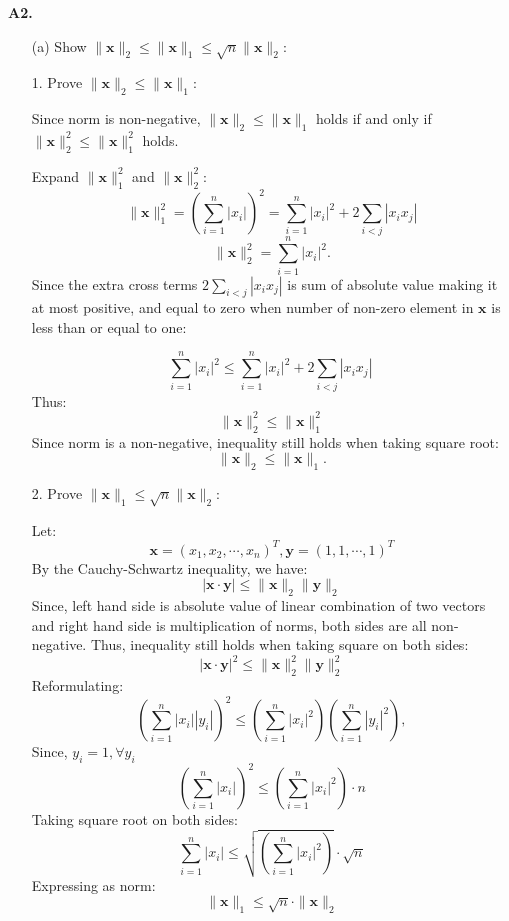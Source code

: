 \documentclass[12pt]{article}
\newcommand{\bvec}[1]{\mathbf{#1}} %
\newcommand{\bmat}[1]{\mathbf{#1}} %
\begin{document}
\textbf{A2.}

\begin{itemize}
    \item[(a)] Show \( \|\mathbf{x}\|_2 \leq \|\mathbf{x}\|_1 \leq \sqrt{n} \|\mathbf{x}\|_2 \):
    
    \vspace{\baselineskip}

    1. Prove \( \|\mathbf{x}\|_2 \leq \|\mathbf{x}\|_1 \):

    Since norm is non-negative, \( \|\mathbf{x}\|_2 \leq \|\mathbf{x}\|_1 \) holds if and only if
    \( \|\mathbf{x}\|_2^2 \leq \|\mathbf{x}\|_1^2 \) holds.
    
    Expand \( \|\mathbf{x}\|_1^2 \) and \( \|\mathbf{x}\|_2^2 \):
    \[
    \|\mathbf{x}\|_1^2 = \left(\sum_{i=1}^n |x_i|\right)^2 = \sum_{i=1}^n |x_i|^2 + 2\sum_{i < j} |x_i x_j|
    \]
    \[
    \|\mathbf{x}\|_2^2 = \sum_{i=1}^n |x_i|^2.
    \]
    Since the extra cross terms \( 2\sum_{i < j} |x_i x_j| \) is sum of absolute value making it at most positive,
    and equal to zero when number of non-zero element in $\bvec{x}$ is less than or equal to one:

    \[ 
     \sum_{i=1}^n |x_i|^2 \le  \sum_{i=1}^n |x_i|^2 + 2\sum_{i < j} |x_i x_j| \
    \]
    Thus:
    \[
    \|\mathbf{x}\|_2^2 \leq \|\mathbf{x}\|_1^2
    \]
    Since norm is a non-negative, inequality still holds when taking square root:
    \[
    \|\mathbf{x}\|_2 \leq \|\mathbf{x}\|_1.
    \]

    2. Prove \( \|\mathbf{x}\|_1 \leq \sqrt{n} \|\mathbf{x}\|_2 \):

    Let:
    \[
    \bmat{x} = (x_1,x_2,\cdots,x_n)^T, \bmat{y}=(1,1,\cdots,1)^T
    \]
    By the Cauchy-Schwartz inequality, we have:
    \[
    |\bmat{x}\cdot \bmat{y}| \le \|\bmat{x}\|_2\|\bmat{y}\|_2
    \]
    Since, left hand side is absolute value of linear combination of two vectors and right hand side is
    multiplication of norms, both sides are all non-negative.
    Thus, inequality still holds when taking square on both sides:
    \[
    |\bmat{x}\cdot \bmat{y}|^2 \le \|\bmat{x}\|_2^2\|\bmat{y}\|_2^2
    \]
    Reformulating:
    \[
    \left( \sum_{i=1}^n |x_i| |y_i| \right)^2 \leq \left( \sum_{i=1}^n |x_i|^2 \right) \left( \sum_{i=1}^n |y_i|^2 \right),
    \]    
    Since, $y_i = 1, \forall y_i$
    \[
        \left( \sum_{i=1}^n |x_i| \right)^2 \leq \left( \sum_{i=1}^n |x_i|^2 \right) \cdot n
    \]
    Taking square root on both sides:
    \[
    \sum_{i=1}^n |x_i|  \leq \sqrt{\left( \sum_{i=1}^n |x_i|^2 \right)} \cdot \sqrt{n}
    \]
    Expressing as norm:
    \[
    \|\bvec{x}\|_1 \le \sqrt{n} \cdot \|\bvec{x}\|_2
    \]
    \vspace{\baselineskip}


\end{itemize}
\end{document}
